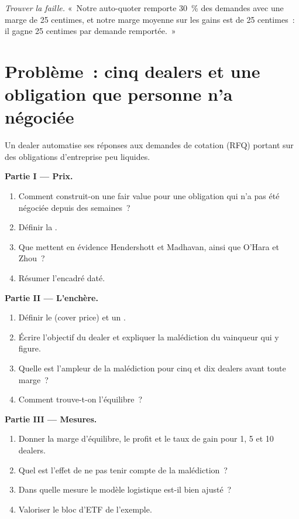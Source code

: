 \begin{exercise}[$\star\star\star$]\label{exo:hf:bond-and-etf-request-for-quote-market-making:8}
\emph{Trouver la faille.} «~Notre auto-quoter remporte 30~\% des demandes avec une marge de 25 centimes, et notre marge moyenne sur les gains est de 25 centimes~: il gagne 25 centimes
par demande remportée.~»
\end{exercise}

\section{Problème~: cinq dealers et une obligation que personne n'a négociée}

\begin{problem}\label{pb:hf:bond-and-etf-request-for-quote-market-making:1}
Un dealer automatise ses réponses aux demandes de cotation (RFQ) portant sur des obligations d'entreprise peu liquides.

\medskip\noindent\textbf{Partie I --- Prix.}
\begin{enumerate}
\item Comment construit-on une fair value pour une obligation qui n'a pas été négociée depuis des semaines~?
\item Définir la .
\item Que mettent en évidence Hendershott et Madhavan, ainsi que O'Hara et Zhou~?
\item Résumer l'encadré daté.
\end{enumerate}

\medskip\noindent\textbf{Partie II --- L'enchère.}
\begin{enumerate}[resume]
\item Définir le  (cover price) et un .
\item Écrire l'objectif du dealer et expliquer la malédiction du vainqueur qui y figure.
\item Quelle est l'ampleur de la malédiction pour cinq et dix dealers avant toute marge~?
\item Comment trouve-t-on l'équilibre~?
\end{enumerate}

\medskip\noindent\textbf{Partie III --- Mesures.}
\begin{enumerate}[resume]
\item Donner la marge d'équilibre, le profit et le taux de gain pour 1, 5 et 10 dealers.
\item Quel est l'effet de ne pas tenir compte de la malédiction~?
\item Dans quelle mesure le modèle logistique est-il bien ajusté~?
\item Valoriser le bloc d'ETF de l'exemple.
\end{enumerate}


\end{problem}
